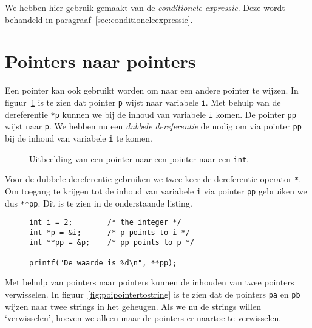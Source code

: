 We hebben hier gebruik gemaakt van de \textsl{conditionele expressie}. Deze wordt behandeld in paragraaf~\ref{sec:conditioneleexpressie}.


\section{Pointers naar pointers}
\label{sec:pointersnaarpointers}
Een pointer kan ook gebruikt worden om naar een andere pointer te wijzen. In figuur~\ref{fig:poipointertopointer} is te zien dat pointer \texttt{p} wijst naar variabele \texttt{i}. Met behulp van de dereferentie \texttt{*p} kunnen we bij de inhoud van variabele \texttt{i} komen. De pointer \texttt{pp} wijst naar \texttt{p}. We hebben nu een \textsl{dubbele dereferentie} de nodig om via pointer \texttt{pp} bij de inhoud van variabele \texttt{i} te komen. 

\begin{figure}[!ht]
\centering
{}
\caption{Uitbeelding van een pointer naar een pointer naar een \texttt{int}.}
\label{fig:poipointertopointer}
\end{figure}

Voor de dubbele dereferentie gebruiken we twee keer de dereferentie-operator \texttt{*}. Om toegang te krijgen tot de inhoud van variabele \texttt{i} via pointer \texttt{pp} gebruiken we dus \texttt{**pp}. Dit is te zien in de onderstaande listing.

\begin{figure}[!ht]
\begin{lstlisting}[caption=Voorbeeld van een pointer naar een pointer.]
int i = 2;        /* the integer */
int *p = &i;      /* p points to i */
int **pp = &p;    /* pp points to p */

printf("De waarde is %d\n", **pp);
\end{lstlisting}
\end{figure}

Met behulp van pointers naar pointers kunnen de inhouden van twee pointers verwisselen. In figuur~\ref{fig:poipointertostring} is te zien dat de pointers \texttt{pa} en \texttt{pb} wijzen naar twee strings in het geheugen. Als we nu de strings willen `verwisselen', hoeven we alleen maar de pointers er naartoe te verwisselen.

